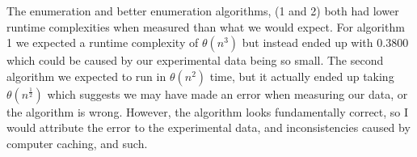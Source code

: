\documentclass{article}
\begin{document}
The enumeration and better enumeration algorithms, (1 and 2) both had lower
runtime complexities when measured than what we would expect. For algorithm 1
we expected a runtime complexity of $\mathcal{\theta}(n^3)$ but instead ended
up with $0.3800$ which could be caused by our experimental data being so small.
The second algorithm we expected to run in $\mathcal{\theta}(n^2)$ time, but it
actually ended up taking $\mathcal{\theta}(n^{\frac{1}{2}})$ which suggests we
may have made an error when measuring our data, or the algorithm is wrong.
However, the algorithm looks fundamentally correct, so I would attribute the
error to the experimental data, and inconsistencies caused by computer caching,
and such.
\end{document}
